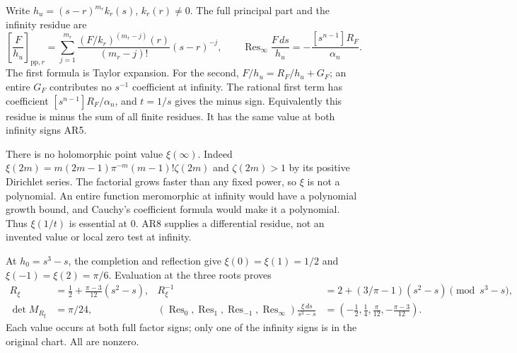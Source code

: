 \documentclass[11pt]{article}
\newcommand{\Res}{\operatorname{Res}}
\begin{document}
Write $h_u=(s-r)^{m_r}k_r(s)$, $k_r(r)\ne0$. The full
principal part and the infinity residue are
\begin{equation}
\left[\frac{F}{h_u}\right]_{\mathrm{pp},r}
=\sum_{j=1}^{m_r}\frac{(F/k_r)^{(m_r-j)}(r)}{(m_r-j)!}
 (s-r)^{-j},\qquad
\Res_\infty\frac{F\,ds}{h_u}
=-\frac{[s^{n-1}]R_F}{\alpha_n}.
\tag{AR8}
\end{equation}
The first formula is Taylor expansion. For the second,
$F/h_u=R_F/h_u+G_F$; an entire $G_F$ contributes no
$s^{-1}$ coefficient at infinity. The rational first term
has coefficient $[s^{n-1}]R_F/\alpha_n$, and $t=1/s$
gives the minus sign. Equivalently this residue is minus
the sum of all finite residues. It has the same value at
both infinity signs AR5.

There is no holomorphic point value $\xi(\infty)$.
Indeed $\xi(2m)=m(2m-1)\pi^{-m}(m-1)!\zeta(2m)$ and
$\zeta(2m)>1$ by its positive Dirichlet series. The factorial
grows faster than any fixed power, so $\xi$ is not a polynomial.
An entire function meromorphic at infinity would have a
polynomial growth bound, and Cauchy's coefficient formula would
make it a polynomial. Thus $\xi(1/t)$ is essential at $0$.
AR8 supplies a differential residue, not an invented value
or local zero test at infinity.

At $h_0=s^3-s$, the completion and reflection give
$\xi(0)=\xi(1)=1/2$ and $\xi(-1)=\xi(2)=\pi/6$.
Evaluation at the three roots proves
\begin{align}
R_\xi&=\tfrac12+\frac{\pi-3}{12}(s^2-s),&
R_\xi^{-1}&=2+(3/\pi-1)(s^2-s)\pmod{s^3-s},\nonumber\\
\det M_{R_\xi}&=\pi/24,&
(\Res_0,\Res_1,\Res_{-1},\Res_\infty)\frac{\xi\,ds}{s^3-s}
&=(-\tfrac12,\tfrac14,\tfrac{\pi}{12},-\tfrac{\pi-3}{12}).
\tag{AR9}
\end{align}
Each value occurs at both full factor signs; only one of the
infinity signs is in the original chart. All are nonzero.
\end{document}
